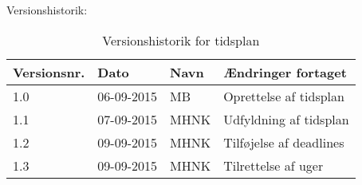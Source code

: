 \documentclass[landscape, 12pt, letterpaper]{article}
\begin{document}
\begin{table}[]
Versionshistorik:
\centering
\caption{Versionshistorik for tidsplan}
\label{my-label}
\begin{tabular}{|l|l|l|l|}
\hline
Versionsnr. & Dato       & Navn & Ændringer fortaget     \\ \hline
1.0         & 06-09-2015 & MB   & Oprettelse af tidsplan \\ \hline
1.1         & 07-09-2015 & MHNK & Udfyldning af tidsplan \\ \hline
1.2         & 09-09-2015 & MHNK & Tilføjelse af deadlines\\ \hline
1.3         & 09-09-2015 & MHNK & Tilrettelse af uger    \\ \hline
\end{tabular}
\end{table}
\end{document}
